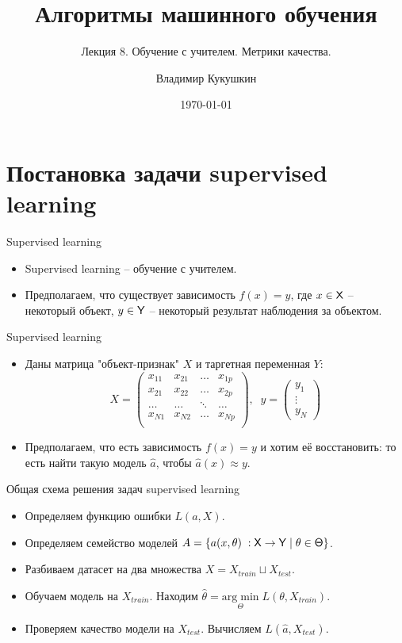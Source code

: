 \documentclass[9pt]{beamer}
\title{Алгоритмы машинного обучения}
\subtitle{Лекция 8. Обучение с учителем. Метрики качества.}
\author{Владимир Кукушкин}
\institute{СПбГЭУ - 2020}
\date{\today}
\begin{document}
\titlepage

\section{Постановка задачи supervised learning}

\begin{frame}{Supervised learning}
\begin{itemize}
    \item Supervised learning -- обучение с учителем.
    \item Предполагаем, что существует зависимость $f(x) = y$, где $x\in \sf{X}$ – некоторый объект, $y\in \sf{Y}$ – некоторый результат наблюдения за объектом.
\end{itemize}
\end{frame}

\begin{frame}{Supervised learning}
\begin{itemize}
    \item Даны матрица "объект-признак"\; $X$ и таргетная переменная $Y$:
$$X = \begin{pmatrix}x_{11}&x_{21}&\ldots&x_{1p}\\x_{21}&x_{22}&\ldots&x_{2p}\\\ldots&\ldots&\ddots&\ldots\\x_{N1}&x_{N2}&\ldots&x_{Np}\\\end{pmatrix},\;\;
y = \begin{pmatrix}y_1\\ \vdots \\ y_N \end{pmatrix}
$$
    \item Предполагаем, что есть зависимость $f(x) = y$ и хотим её восстановить: то есть найти такую модель $\hat a$, чтобы $\hat a(x) \approx y$.
\end{itemize}
\end{frame}

\begin{frame}{Общая схема решения задач supervised learning}
    \begin{itemize}
        \item Определяем функцию ошибки $L(a, X)$.
        \item Определяем семейство моделей $A = \{a(x, \theta)\; : \sf{X} \rightarrow \sf{Y} \; | \; \theta \in \Theta\}$.
        \item Разбиваем датасет на два множества $X = X_{train} \sqcup X_{test}$.
        \item Обучаем модель на $X_{train}$. Находим $\hat \theta = \underset{\Theta}{\mathrm{arg\;min}}\;L(\theta, X_{train})$.
        \item Проверяем качество модели на $X_{test}$. Вычисляем $L(\hat a, X_{test})$.
    \end{itemize}
\end{frame}
\end{document}
